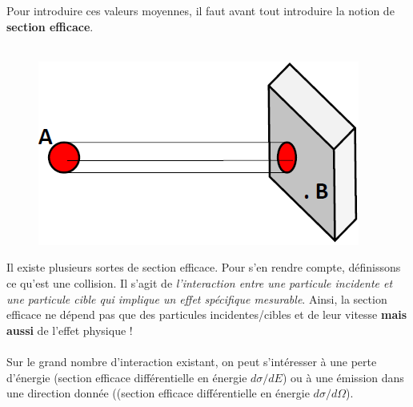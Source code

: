 Pour introduire ces valeurs moyennes, il faut avant tout introduire la notion de 
\textbf{section efficace}.\ \\

\ \\

	\begin{figure}
	\vspace{-5mm}
	\includegraphics[scale=0.5]{ch1/image3.png}
	\end{figure}
Il existe plusieurs sortes de section efficace. Pour s'en rendre compte, définissons ce
qu'est une collision. Il s'agit de \textit{l'interaction entre une particule incidente et une particule cible qui implique un effet spécifique mesurable}. Ainsi, la section efficace ne 
dépend pas que des particules incidentes/cibles et de leur vitesse \textbf{mais aussi} de l'effet
physique !\\
\ \\

Sur le grand nombre d'interaction existant, on peut s'intéresser à une perte d'énergie 
(section efficace différentielle en énergie $d\sigma/dE$) ou à une émission dans une 
direction donnée ((section efficace différentielle en énergie $d\sigma/d\Omega$).\\

